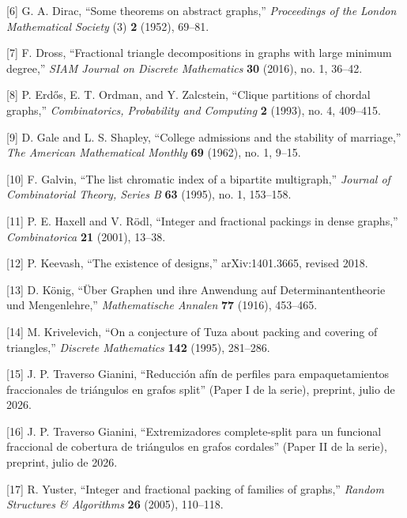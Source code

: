 \documentclass[
  spanish,
  11pt,
  a4paper,
]{article}
\begin{document}
{[}6{]} G. A. Dirac, ``Some theorems on abstract graphs,'' \emph{Proceedings of the London Mathematical Society} (3) \textbf{2} (1952), 69--81.

{[}7{]} F. Dross, ``Fractional triangle decompositions in graphs with large minimum degree,'' \emph{SIAM Journal on Discrete Mathematics} \textbf{30} (2016), no. 1, 36--42.

{[}8{]} P. Erdős, E. T. Ordman, and Y. Zalcstein, ``Clique partitions of chordal graphs,'' \emph{Combinatorics, Probability and Computing} \textbf{2} (1993), no. 4, 409--415.

{[}9{]} D. Gale and L. S. Shapley, ``College admissions and the stability of marriage,'' \emph{The American Mathematical Monthly} \textbf{69} (1962), no. 1, 9--15.

{[}10{]} F. Galvin, ``The list chromatic index of a bipartite multigraph,'' \emph{Journal of Combinatorial Theory, Series B} \textbf{63} (1995), no. 1, 153--158.

{[}11{]} P. E. Haxell and V. Rödl, ``Integer and fractional packings in dense graphs,'' \emph{Combinatorica} \textbf{21} (2001), 13--38.

{[}12{]} P. Keevash, ``The existence of designs,'' arXiv:1401.3665, revised 2018.

{[}13{]} D. König, ``Über Graphen und ihre Anwendung auf Determinantentheorie und Mengenlehre,'' \emph{Mathematische Annalen} \textbf{77} (1916), 453--465.

{[}14{]} M. Krivelevich, ``On a conjecture of Tuza about packing and covering of triangles,'' \emph{Discrete Mathematics} \textbf{142} (1995), 281--286.

{[}15{]} J. P. Traverso Gianini, ``Reducción afín de perfiles para empaquetamientos fraccionales de triángulos en grafos split'' (Paper I de la serie), preprint, julio de 2026.

{[}16{]} J. P. Traverso Gianini, ``Extremizadores complete-split para un funcional fraccional de cobertura de triángulos en grafos cordales'' (Paper II de la serie), preprint, julio de 2026.

{[}17{]} R. Yuster, ``Integer and fractional packing of families of graphs,'' \emph{Random Structures \& Algorithms} \textbf{26} (2005), 110--118.
\endgroup
\end{document}
